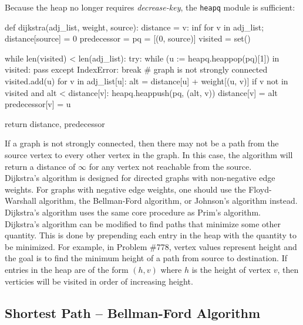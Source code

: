 \documentclass[12pt, titlepage]{article}
\begin{document}
Because the heap no longer requires \textit{decrease-key}, the \texttt{heapq} module is sufficient: \medskip

\begin{python}
def dijkstra(adj_list, weight, source):
    distance = {v: inf for v in adj_list}; distance[source] = 0
    predecessor = {}
    pq = [(0, source)]
    visited = set()

    while len(visited) < len(adj_list):
        try:
            while (u := heapq.heappop(pq)[1]) in visited: pass
        except IndexError:
            break  # graph is not strongly connected
        visited.add(u)
        for v in adj_list[u]:
            alt = distance[u] + weight[(u, v)]
            if v not in visited and alt < distance[v]:
                heapq.heappush(pq, (alt, v))
                distance[v] = alt
                predecessor[v] = u

    return distance, predecessor
\end{python}

If a graph is not strongly connected, then there may not be a path from the source vertex to every other vertex in the graph. In this case, the algorithm will return a distance of $\infty$ for any vertex not reachable from the source. \\

Dijkstra's algorithm is designed for directed graphs with non-negative edge weights. For graphs with negative edge weights, one should use the Floyd-Warshall algorithm, the Bellman-Ford algorithm, or Johnson's algorithm instead. \\

Dijkstra's algorithm uses the same core procedure as Prim's algorithm. \\

Dijkstra's algorithm can be modified to find paths that minimize some other quantity. This is done by prepending each entry in the heap with the quantity to be minimized. For example, in Problem \#778, vertex values represent height and the goal is to find the minimum height of a path from source to destination. If entries in the heap are of the form $(h, v)$ where $h$ is the height of vertex $v$, then verticies will be visited in order of increasing height.

\subsection{Shortest Path -- Bellman-Ford Algorithm} \label{bellman-ford}
\end{document}

